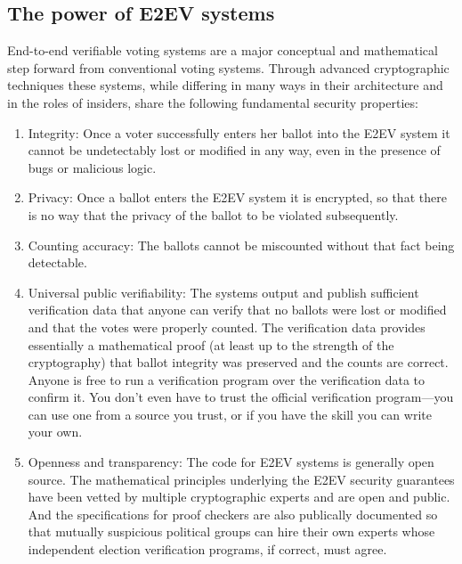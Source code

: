 \subsection{The power of E2EV systems}

End-to-end verifiable voting systems are a major conceptual and
mathematical step forward from conventional voting systems. Through
advanced cryptographic techniques these systems, while differing in
many ways in their architecture and in the roles of insiders, share
the following fundamental security properties:

\begin{enumerate}[label={\alph*})]
\item Integrity: Once a voter successfully enters her ballot into the
E2EV system it cannot be undetectably lost or modified in any way,
even in the presence of bugs or malicious logic.

\item Privacy: Once a ballot enters the E2EV system it is encrypted, so
that there is no way that the privacy of the ballot to be violated
subsequently.

\item Counting accuracy: The ballots cannot be miscounted without that
fact being detectable.

\item Universal public verifiability: The systems output and publish
sufficient verification data that anyone can verify that no ballots
were lost or modified and that the votes were properly counted. The
verification data provides essentially a mathematical proof (at least
up to the strength of the cryptography) that ballot integrity was
preserved and the counts are correct. Anyone is free to run a
verification program over the verification data to confirm it. You
don't even have to trust the official verification program---you can
use one from a source you trust, or if you have the skill you can
write your own.

\item Openness and transparency: The code for E2EV systems is generally
open source. The mathematical principles underlying the E2EV security
guarantees have been vetted by multiple cryptographic experts and are
open and public. And the specifications for proof checkers are also
publically documented so that mutually suspicious political groups can
hire their own experts whose independent election verification
programs, if correct, must agree.
\end{enumerate}

